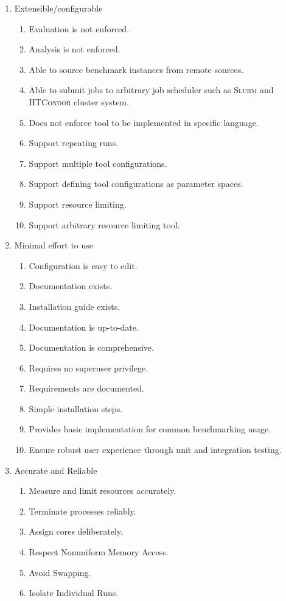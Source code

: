 \begin{enumerate}[noitemsep]
    \item Extensible/configurable
    \begin{enumerate}[noitemsep]
        \item Evaluation is not enforced.
        \item Analysis is not enforced.
        \item Able to source benchmark instances from remote sources.
        \item Able to submit jobs to arbitrary job scheduler such as \textsc{Slurm} and \textsc{HTCondor} cluster system.
        \item Does not enforce tool to be implemented in specific language.
        \item Support repeating runs.
        \item Support multiple tool configurations.
        \item Support defining tool configurations as parameter spaces.
        \item Support resource limiting.
        \item Support arbitrary resource limiting tool.
    \end{enumerate}

    \item Minimal effort to use
    \begin{enumerate}[noitemsep]
        \item Configuration is easy to edit.
        \item Documentation exists.
        \item Installation guide exists.
        \item Documentation is up-to-date.
        \item Documentation is comprehensive.
        \item Requires no superuser privilege.
        \item Requirements are documented.
        \item Simple installation steps.
        \item Provides basic implementation for common benchmarking usage.
        \item Ensure robust user experience through unit and integration testing.
    \end{enumerate}

    \item Accurate and Reliable
    \begin{enumerate}[noitemsep]
        \item Measure and limit resources accurately.
        \item Terminate processes reliably.
        \item Assign cores deliberately.
        \item Respect Nonuniform Memory Access.
        \item Avoid Swapping.
        \item Isolate Individual Runs.
    \end{enumerate}


\end{enumerate}
